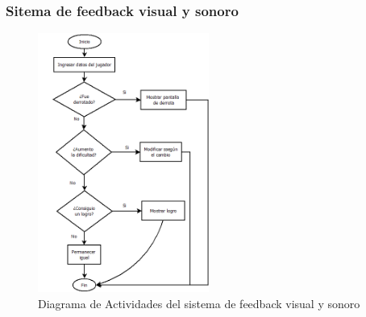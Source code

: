 \subsubsection{Sitema de feedback visual y sonoro}
\begin{figure}[H]
    \centering
    \includegraphics[width=0.5\textwidth]{recursos/Imagenes/DiagramaRetroalimentacion.png} 
    \caption{Diagrama de Actividades del sistema de feedback visual y sonoro}
    \label{fig:mi_imagen}
\end{figure}